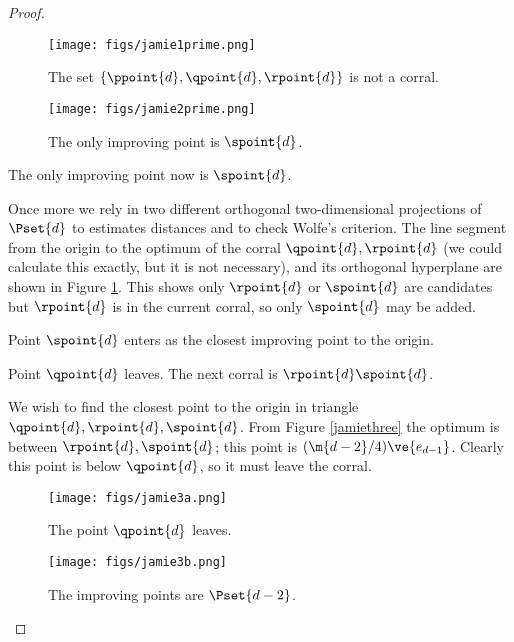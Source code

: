 \begin{proof}
\begin{figure}
\begin{minipage}[t]{0.49\textwidth}
\begin{center}
\texttt{[image: figs/jamie1prime.png]}
\end{center}
\caption{The set $\{\ppoint{d},\qpoint{d},\rpoint{d}\}$ is not a corral.}\label{jamie1prime}
\end{minipage}
\begin{minipage}[t]{0.49\textwidth}
\begin{center}
\texttt{[image: figs/jamie2prime.png]}
\end{center}
\caption{The only improving point is $\spoint{d}$.}\label{jamietwoprime}
\end{minipage}
\end{figure}


\begin{claim}
The only improving point now is $\spoint{d}$. 
\end{claim}
\begin{claimproof}
Once more we rely in two different orthogonal two-dimensional projections of $\Pset{d}$ to
estimates distances and to check Wolfe's criterion. The line segment  from the origin to the optimum of the corral $\qpoint{d},\rpoint{d}$ (we
could calculate this exactly, but it is not necessary), and
its orthogonal hyperplane are shown in Figure \ref{jamietwoprime}.  This shows only $\rpoint{d}$ or $\spoint{d}$ are
candidates but $\rpoint{d}$ is in the current corral, so only $\spoint{d}$ may be added.
\end{claimproof}



Point $\spoint{d}$ enters as the closest improving point to the origin.
\begin{claim}
Point $\qpoint{d}$ leaves.
The next corral is $\rpoint{d} \spoint{d}$. 
\end{claim}
\begin{claimproof}
We wish to find the closest point to the origin in triangle $\qpoint{d},\rpoint{d},\spoint{d}$. From
Figure \ref{jamiethree} the optimum is between $\rpoint{d},\spoint{d}$; this point is $(\m{d-2}/4) \ve{e_{d-1}}$. Clearly
this point is below $\qpoint{d}$, so it must leave the corral. 
\end{claimproof}

\begin{figure}
\begin{minipage}{0.49\textwidth}
\begin{center}
\texttt{[image: figs/jamie3a.png]}
\end{center}
\caption{The point $\qpoint{d}$ leaves.}\label{jamiethree}
\end{minipage}
\begin{minipage}{0.49\textwidth}
\begin{center}
\texttt{[image: figs/jamie3b.png]}
\end{center}
\caption{The improving points are $\Pset{d-2}$.}\label{jamie3b}
\end{minipage}
\end{figure}


\end{proof}
